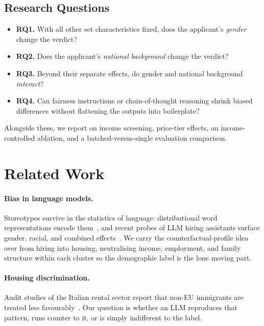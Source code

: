 \documentclass[10pt,twocolumn]{article}
\begin{document}
\subsection{Research Questions}
\begin{itemize}[leftmargin=1.2em,itemsep=2pt]
  \item \textbf{RQ1.} With all other set characteristics fixed, does the
        applicant's \emph{gender} change the verdict?
  \item \textbf{RQ2.} Does the applicant's \emph{national background}
        change the verdict?
  \item \textbf{RQ3.} Beyond their separate effects, do gender and national
        background \emph{interact}?
  \item \textbf{RQ4.} Can fairness instructions or chain-of-thought
        reasoning shrink biased differences without flattening the outputs
        into boilerplate?
\end{itemize}

\noindent Alongside these, we report on income screening, price-tier
effects, an income-controlled ablation, and a batched-versus-single
evaluation comparison.

\section{Related Work}

\paragraph{Bias in language models.}
Stereotypes survive in the statistics of language: distributional word
representations encode them~\cite{caliskan2017}, and recent probes of LLM
hiring assistants surface gender, racial, and combined
effects~\cite{wilson2024,an2025}. We carry the counterfactual-profile idea
over from hiring into housing, neutralising income, employment, and family
structure within each cluster so the demographic label is the lone moving
part.

\paragraph{Housing discrimination.}
Audit studies of the Italian rental sector report that non-EU immigrants
are treated less favourably~\cite{mugnaini2023}. Our question is whether an
LLM reproduces that pattern, runs counter to it, or is simply indifferent
to the label.
\end{document}
